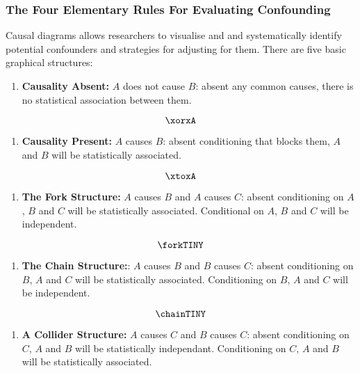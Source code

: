 \documentclass[
  singlecolumn]{article}
\providecommand{\tightlist}{%
  \setlength{\itemsep}{0pt}\setlength{\parskip}{0pt}}\usepackage{longtable,booktabs,array}
\begin{document}
\subsubsection{The Four Elementary Rules For Evaluating
Confounding}\label{sec-four-rules}

Causal diagrams allows researchers to visualise and and systematically
identify potential confounders and strategies for adjusting for them.
There are five basic graphical structures:

\begin{enumerate}
\def\labelenumi{\arabic{enumi}.}
\tightlist
\item
  \textbf{Causality Absent:} \(A\) does not cause \(B\): absent any
  common causes, there is no statistical association between them.
\end{enumerate}

\[\xorxA\]

\begin{enumerate}
\def\labelenumi{\arabic{enumi}.}
\setcounter{enumi}{1}
\tightlist
\item
  \textbf{Causality Present:} \(A\) causes \(B\): absent conditioning
  that blocks them, \(A\) and \(B\) will be statistically associated.
\end{enumerate}

\[\xtoxA\]

\begin{enumerate}
\def\labelenumi{\arabic{enumi}.}
\setcounter{enumi}{2}
\tightlist
\item
  \textbf{The Fork Structure:} \(A\) causes \(B\) and \(A\) causes
  \(C\): absent conditioning on \(A\), \(B\) and \(C\) will be
  statistically associated. Conditional on \(A\), \(B\) and \(C\) will
  be independent.
\end{enumerate}

\[\forkTINY\]

\begin{enumerate}
\def\labelenumi{\arabic{enumi}.}
\setcounter{enumi}{3}
\tightlist
\item
  \textbf{The Chain Structure:}: \(A\) causes \(B\) and \(B\) causes
  \(C\): absent conditioning on \(B\), \(A\) and \(C\) will be
  statistically associated. Conditioning on \(B\), \(A\) and \(C\) will
  be independent.
\end{enumerate}

\[\chainTINY\]

\begin{enumerate}
\def\labelenumi{\arabic{enumi}.}
\setcounter{enumi}{4}
\tightlist
\item
  \textbf{A Collider Structure:} \(A\) causes \(C\) and \(B\) causes
  \(C\): absent conditioning on \(C\), \(A\) and \(B\) will be
  statistically independant. Conditioning on \(C\), \(A\) and \(B\) will
  be statistically associated.
\end{enumerate}
\end{document}
